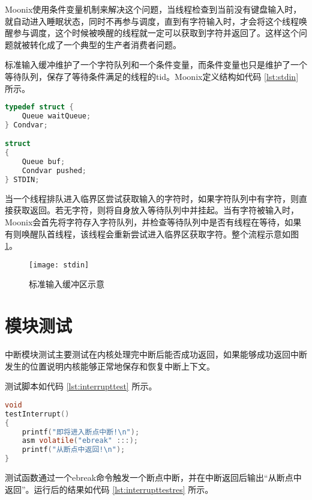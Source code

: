 Moonix使用条件变量机制来解决这个问题，当线程检查到当前没有键盘输入时，就自动进入睡眠状态，同时不再参与调度，直到有字符输入时，才会将这个线程唤醒参与调度，这个时候被唤醒的线程就一定可以获取到字符并返回了。这样这个问题就被转化成了一个典型的生产者消费者问题。

标准输入缓冲维护了一个字符队列和一个条件变量，而条件变量也只是维护了一个等待队列，保存了等待条件满足的线程的tid。Moonix定义结构如代码 \ref{lst:stdin} 所示。

\begin{minipage}[c]{0.95\textwidth}
\begin{lstlisting}[language={C}, caption={标准输入缓冲和条件变量}, label={lst:stdin}]
typedef struct {
	Queue waitQueue;
} Condvar;

struct
{
	Queue buf;
	Condvar pushed;
} STDIN;
\end{lstlisting}
\end{minipage}

当一个线程排队进入临界区尝试获取输入的字符时，如果字符队列中有字符，则直接获取返回。若无字符，则将自身放入等待队列中并挂起。当有字符被输入时，Moonix会首先将字符存入字符队列，并检查等待队列中是否有线程在等待，如果有则唤醒队首线程，该线程会重新尝试进入临界区获取字符。整个流程示意如图 \ref{pic:stdin}。

\begin{figure}[htpb]
	\centering
	\texttt{[image: stdin]}
	\setlength{\abovecaptionskip}{2pt}
	\caption{标准输入缓冲区示意}
	\label{pic:stdin}
\end{figure}

\section{模块测试}

中断模块测试主要测试在内核处理完中断后能否成功返回，如果能够成功返回中断发生的位置说明内核能够正常地保存和恢复中断上下文。

测试脚本如代码 \ref{lst:interrupttest} 所示。

\begin{minipage}[c]{0.95\textwidth}
\begin{lstlisting}[language={C}, caption={断点中断测试函数}, label={lst:interrupttest}]
void
testInterrupt()
{
	printf("即将进入断点中断!\n");
	asm volatile("ebreak" :::);
	printf("从断点中返回!\n");
}
\end{lstlisting}
\end{minipage}

测试函数通过一个ebreak命令触发一个断点中断，并在中断返回后输出“从断点中返回”。运行后的结果如代码 \ref{lst:interrupttestres} 所示。

